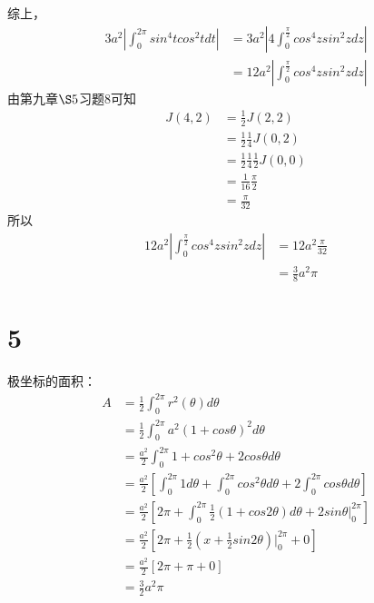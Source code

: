 \documentclass{article}
\begin{document}
综上，
\begin{align*}
  3a^2 \left|\int_{0}^{2\pi} sin^4 t cos^2 t dt \right|
   & = 3a^2 \left| 4 \int_{0}^{\frac{\pi}{2}} cos^4 z sin^2z dz \right| \\
   & = 12a^2 \left| \int_{0}^{\frac{\pi}{2}} cos^4 z sin^2z dz \right|
\end{align*}
由第九章$\S 5$习题8可知
\begin{align*}
  J(4,2) & = \frac{1}{2}J(2, 2)                         \\
         & = \frac{1}{2} \frac{1}{4}J(0, 2)             \\
         & = \frac{1}{2} \frac{1}{4} \frac{1}{2}J(0, 0) \\
         & = \frac{1}{16} \frac{\pi}{2}                 \\
         & = \frac{\pi}{32}
\end{align*}
所以
\begin{align*}
  12a^2 \left| \int_{0}^{\frac{\pi}{2}} cos^4 z sin^2z dz \right|
   & = 12a^2 \frac{\pi}{32} \\
   & = \frac{3}{8} a^2 \pi
\end{align*}

\section*{5}

极坐标的面积：
\begin{align*}
  A & = \frac{1}{2} \int_{0}^{2\pi} r^2(\theta) d \theta                                                                                   \\
    & = \frac{1}{2} \int_{0}^{2\pi} a^2(1 + cos\theta)^2 d \theta                                                                          \\
    & = \frac{a^2}{2} \int_{0}^{2\pi} 1 + cos^2\theta + 2 cos\theta d \theta                                                               \\
    & = \frac{a^2}{2} \left[\int_{0}^{2\pi} 1 d\theta + \int_{0}^{2\pi} cos^2\theta d\theta + 2 \int_{0}^{2\pi} cos\theta d \theta \right] \\
    & = \frac{a^2}{2} \left[2\pi + \int_{0}^{2\pi} \frac{1}{2}(1 + cos2\theta) d\theta + 2 sin\theta \bigg|_0^{2\pi} \right]               \\
    & = \frac{a^2}{2} \left[2\pi + \frac{1}{2}(x + \frac{1}{2}sin2\theta)\bigg|_0^{2\pi} + 0 \right]                                       \\
    & = \frac{a^2}{2} \left[2\pi + \pi + 0\right]                                                                                          \\
    & = \frac{3}{2}a^2 \pi
\end{align*}
\end{document}
